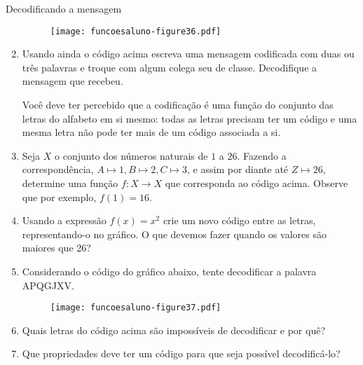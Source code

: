\documentclass[extrafontsizes, twoside, 11pt, openright, final]{memoir}
\begin{document}
\begin{task}{ Decodificando a mensagem}
\begin{enumerate}
\begin{figure}[H]
\begin{center}
				      \texttt{[image: funcoesaluno-figure36.pdf]}
			      \end{center}
		      \end{figure}
		\item Usando ainda o código acima escreva uma mensagem codificada com duas ou três palavras e troque com algum colega seu de classe. Decodifique a mensagem que recebeu.

		      Você deve ter percebido que a codificação é uma função do conjunto das letras do alfabeto em si mesmo: todas as letras precisam ter um código e uma mesma letra não pode ter mais de um código associada a si.

		\item Seja $X$ o conjunto dos números naturais de $1$ a $26$. Fazendo a correspondência, $A \mapsto 1, B \mapsto 2, C \mapsto 3$, e assim por diante até $Z \mapsto 26$, determine uma função $f:X\to X$ que corresponda ao código acima. Observe que por exemplo, $f(1)=16$.

		\item Usando a expressão $f(x)=x^2$ crie um novo código entre as letras, representando-o no gráfico. O que devemos fazer quando os valores são  maiores que 26?

		\item Considerando o código do gráfico abaixo, tente decodificar a palavra APQGJXV.

		      \begin{figure}[H]
			      \begin{center}
				      \centering

				      \texttt{[image: funcoesaluno-figure37.pdf]}
			      \end{center}
		      \end{figure}

		\item Quais letras do código acima são impossíveis de decodificar e por quê?

		\item Que propriedades deve ter um código para que seja possível decodificá-lo?

	\end{enumerate}

\end{task}
\end{document}
